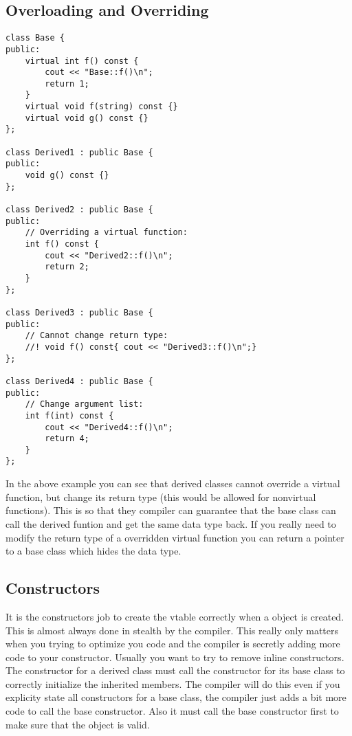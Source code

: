 \documentclass[12pt]{article}
\begin{document}
\subsection*{Overloading and Overriding}
\begin{lstlisting}
class Base {
public:
    virtual int f() const {
        cout << "Base::f()\n";
        return 1;
    }
    virtual void f(string) const {}
    virtual void g() const {}
};

class Derived1 : public Base {
public:
    void g() const {}
};

class Derived2 : public Base {
public:
    // Overriding a virtual function:
    int f() const {
        cout << "Derived2::f()\n";
        return 2;
    }
};

class Derived3 : public Base {
public:
    // Cannot change return type:
    //! void f() const{ cout << "Derived3::f()\n";}
};

class Derived4 : public Base {
public:
    // Change argument list:
    int f(int) const {
        cout << "Derived4::f()\n";
        return 4;
    }
};
\end{lstlisting}

In the above example you can see that derived classes cannot override a virtual function, but change its return type (this would be allowed for nonvirtual functions). This is so that they compiler can guarantee that the base class can call the derived funtion and get the same data type back. If you really need to modify the return type of a overridden virtual function you can return a pointer to a base class which hides the data type.

\subsection*{Constructors}
It is the constructors job to create the vtable correctly when a object is created. This is almost always done in stealth by the compiler. This really only matters when you trying to optimize you code and the compiler is secretly adding more code to your constructor. Usually you want to try to remove inline constructors. The constructor for a derived class must call the constructor for its base class to correctly initialize the inherited members. The compiler will do this even if you explicity state all constructors for a base class, the compiler just adds a bit more code to call the base constructor. Also it must call the base constructor first to make sure that the object is valid.
\end{document}
